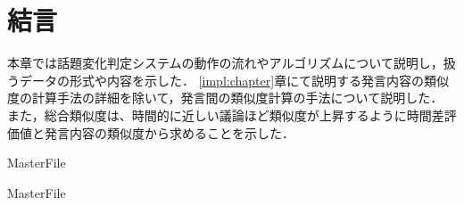 \section{結言}
\label{model:conclusion}
本章では話題変化判定システムの動作の流れやアルゴリズムについて説明し，扱うデータの形式や内容を示した．
\ref{impl:chapter}章にて説明する発言内容の類似度の計算手法の詳細を除いて，発言間の類似度計算の手法について説明した．
また，総合類似度は、時間的に近しい議論ほど類似度が上昇するように時間差評価値と発言内容の類似度から求めることを示した．

 \expandafter\ifx\csname MasterFile\endcsname\relax
	\def\BibFile{hoge}
	
  \fi
  \expandafter\ifx\csname MasterFile\endcsname\relax
  
  \fi
